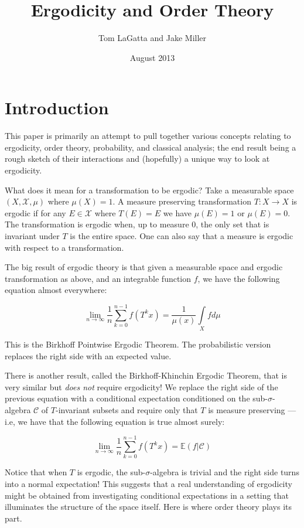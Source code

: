 \documentclass[letterpaper,10pt,oneside,onecolumn,reqno]{amsart}
\author{Tom LaGatta and Jake Miller}
\title{Ergodicity and Order Theory}
\date{August 2013}
\newcommand{\C}{\mathcal C}
\newcommand{\E}{\mathbb E}
\newcommand{\X}{\mathcal X}
\theoremstyle{definition}
\begin{document}
\maketitle

\part{Introduction}

This paper is primarily an attempt to pull together various concepts
relating to ergodicity, order theory, probability, and classical
analysis; the end result being a rough sketch of their interactions
and (hopefully) a unique way to look at ergodicity.

What does it mean for a transformation to be ergodic? Take a
measurable space $(X,\X,\mu)$ where $\mu(X) = 1 $. A measure
preserving transformation $T : X \to X$ is ergodic if for any $E \in
\X$ where $T(E) = E$ we have $\mu(E) = 1$ or $\mu(E) = 0$. The
transformation is ergodic when, up to measure 0, the only set that is
invariant under $T$ is the entire space. One can also say that a
measure is ergodic with respect to a transformation.

The big result of ergodic theory is that given a measurable space and
ergodic transformation as above, and an integrable function $f$, we
have the following equation almost everywhere:

\begin{equation}
  \label{eq:1}
  \lim_{n \to \infty}\frac{1}{n} \sum\limits_{k=0}^{n-1}f(T^k x) =
  \frac{1}{\mu(x)}\int\limits_X fd\mu
\end{equation}

This is the Birkhoff Pointwise Ergodic Theorem. The probabilistic
version replaces the right side with an expected value.

There is another result, called the Birkhoff-Khinchin Ergodic Theorem,
that is very similar but \emph{does not} require ergodicity!  We
replace the right side of the previous equation with a conditional
expectation conditioned on the sub-$\sigma$-algebra $\C$ of
$T$-invariant subsets and require only that $T$ is measure preserving
--- i.e, we have that the following equation is true almost surely:

\begin{equation}
  \label{eq:2}
  \lim_{n \to \infty}\frac{1}{n} \sum\limits_{k=0}^{n-1}f(T^k x) =
  \E(f | \C)
\end{equation}

Notice that when $T$ is ergodic, the sub-$\sigma$-algebra is trivial
and the right side turns into a normal expectation! This suggests that
a real understanding of ergodicity might be obtained from
investigating conditional expectations in a setting that illuminates
the structure of the space itself. Here is where order theory plays
its part.
\end{document}
